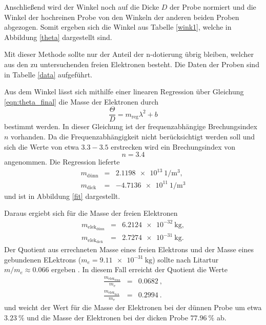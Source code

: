 Anschließend wird der Winkel noch auf die Dicke $D$ der Probe normiert und die Winkel der hochreinen Probe von den Winkeln der anderen beiden Proben abgezogen.
Somit ergeben sich die Winkel aus Tabelle \ref{wink1}, welche in Abbildung \ref{theta} dargestellt sind.

Mit dieser Methode sollte nur der Anteil der n-dotierung übrig bleiben, welcher aus den zu untersuchenden freien Elektronen besteht.
Die Daten der Proben sind in Tabelle \ref{data} aufgeführt.

Aus dem Winkel lässt sich mithilfe einer linearen Regression über Gleichung \eqref{eqn:theta_final} die Masse der Elektronen durch
\begin{equation*}
	\frac{\Theta}{D} = m_\text{reg} \lambda^2 + b
\end{equation*}
bestimmt werden.
In dieser Gleichung ist der frequenzabhängige Brechungsindex $n$ vorhanden. Da die Frequenzabhängigkeit nicht berücksichtigt werden soll und sich die Werte von etwa $3.3-3.5$ \cite{GeAs} erstrecken wird ein Brechungsindex von 
\begin{equation*}
	n = 3.4
\end{equation*}
angenommen.
Die Regression lieferte 
\begin{eqnarray*}
	m_\text{dünn} &=& \SI{2.1198e13}{1\per\meter^3},\\
	m_\text{dick} &=& \SI{-4.7136e11}{1\per\meter^3}
\end{eqnarray*}
und ist in Abbildung \ref{fit} dargestellt.

Daraus ergiebt sich für die Masse der freien Elektronen
\begin{eqnarray*}
	m_{\text{elek}_\text{dünn}} &=& \SI{6.2124e-32}{\kilogram},\\
	m_{\text{elek}_\text{dick}} &=& \SI{2.7274e-31}{\kilogram}.
\end{eqnarray*}
Der Quotient aus errechneten Masse eines freien Elektrons und der Masse eines gebundenen ELektrons ($m_e = \SI{9.11e-31}{\kilogram}$) sollte nach Litartur $m/m_e \approx 0.066$ ergeben \cite{kittel}.
In diesem Fall erreicht der Quotient die Werte
\begin{eqnarray*}
	\frac{m_{\text{elek}_\text{dünn}}}{m_\text{e}} &=& \SI{0.0682}{},\\
	\frac{m_{\text{elek}_\text{dick}}}{m_\text{e}} &=& \SI{0.2994}{}.
\end{eqnarray*}
und weicht der Wert für die Masse der Elektronen bei der dünnen Probe um etwa $\SI{3.23}{\percent}$ und die Masse der Elektronen bei der dicken Probe $\SI{77.96}{\percent}$ ab.

